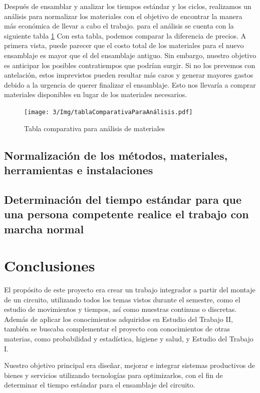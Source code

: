     Después de ensamblar y analizar los tiempos estándar y los ciclos, realizamos un análisis para normalizar los materiales con el objetivo de encontrar la manera más económica de llevar a cabo el trabajo. para el análisis se cuenta con la siguiente tabla \ref{fig:tablaComparativaParaAnálisis}
    Con esta tabla, podemos comparar la diferencia de precios. A primera vista, puede parecer que el costo total de los materiales para el nuevo ensamblaje es mayor que el del ensamblaje antiguo. Sin embargo, nuestro objetivo es anticipar los posibles contratiempos que podrían surgir. Si no los prevemos con antelación, estos imprevistos pueden resultar más caros y generar mayores gastos debido a la urgencia de querer finalizar el ensamblaje. Esto nos llevaría a comprar materiales disponibles en lugar de los materiales necesarios.
    \begin{figure}[H]
        \centering
        \texttt{[image: 3/Img/tablaComparativaParaAnálisis.pdf]}
        \caption{Tabla comparativa para análisis de materiales} 
        \label{fig:tablaComparativaParaAnálisis}
    \end{figure}
    \subsection{Normalización de los métodos, materiales, herramientas e instalaciones}
    
    \subsection{Determinación del tiempo estándar para que una persona competente realice el trabajo con marcha normal}
    
    \section{Conclusiones}
    
    El propósito de este proyecto era crear un trabajo integrador a partir del montaje de un circuito, utilizando todos los temas vistos durante el semestre, como el estudio de movimientos y tiempos, así como muestras continuas o discretas. Además de aplicar los conocimientos adquiridos en Estudio del Trabajo II, también se buscaba complementar el proyecto con conocimientos de otras materias, como probabilidad y estadística, higiene y salud, y Estudio del Trabajo I.
    
    Nuestro objetivo principal era diseñar, mejorar e integrar sistemas productivos de bienes y servicios utilizando tecnologías para optimizarlos, con el fin de determinar el tiempo estándar para el ensamblaje del circuito.
    
